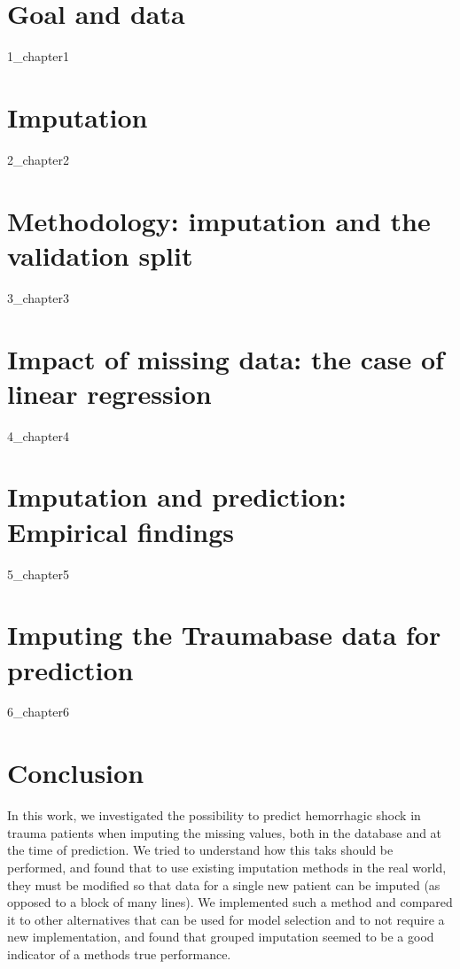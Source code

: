 \documentclass[12pt, a4paper]{memoir}
\begin{document}
\chapter{Goal and data}
\label{data}
 {1_chapter1}

\chapter{Imputation}
\label{imputation}
{2_chapter2}
		
\chapter{Methodology: imputation and the validation split}
\label{validation}
{3_chapter3}
		
		
\chapter{Impact of missing data: the case of linear regression}
\label{linreg}
{4_chapter4} 

\chapter{Imputation and prediction: Empirical findings}
\label{empirical}
{5_chapter5}

\chapter{Imputing the Traumabase data for prediction}
\label{analysis}
{6_chapter6}

\chapter*{Conclusion}
In this work, we investigated the possibility to predict hemorrhagic shock in trauma patients when imputing the missing values, both in the database and at the time of prediction. We tried to understand how this taks should be performed, and found that to use existing imputation methods in the real world, they must be modified so that data for a single new patient can be imputed (as opposed to a block of many lines). We implemented such a method and compared it to other alternatives that can be used for model selection and to not require a new implementation, and found that grouped imputation seemed to be a good indicator of a methods true performance.
\end{document}
